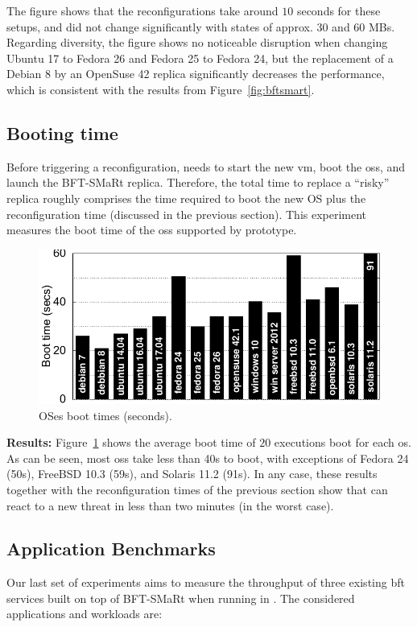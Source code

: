 The figure shows that the reconfigurations take around $10$ seconds for these setups, and did not change significantly with states of approx. $30$ and $60$ MBs.
Regarding diversity, the figure shows no noticeable disruption when changing Ubuntu 17 to Fedora 26 and Fedora 25 to Fedora 24, but the replacement of a Debian 8 by an OpenSuse 42 replica significantly decreases the performance, which is consistent with the results from Figure~\ref{fig:bftsmart}.

\subsection{Booting time}

Before triggering a reconfiguration, \system needs to start the new \gls{vm}, boot the \glspl{os}, and launch the BFT-SMaRt replica.
Therefore, the total time to replace a ``risky'' replica roughly comprises the time required to boot the new OS plus the reconfiguration time (discussed in the previous section).
This experiment measures the boot time of the \glspl{os} supported by \system prototype. 

\begin{figure}[h]
\begin{center}
\includegraphics[width=.8\columnwidth]{images/gnuplot/vagrant/updown/boot.pdf}
\vspace{-5mm}
\caption{OSes boot times (seconds).}
\label{fig:boot}
\end{center}
\end{figure}

\textbf{Results:}
Figure~\ref{fig:boot} shows the average boot time of $20$ executions boot for each \gls{os}.
As can be seen, most \glspl{os} take less than 40s to boot, with exceptions of Fedora 24 (50s), FreeBSD 10.3 (59s), and Solaris 11.2 (91s).
In any case, these results together with the reconfiguration times of the previous section show that \system can react to a new threat in less than two minutes (in the worst case).

\subsection{Application Benchmarks}
Our last set of experiments aims to measure the throughput of three existing \gls{bft} services built on top of BFT-SMaRt when running in \system.
The considered applications and workloads are:


